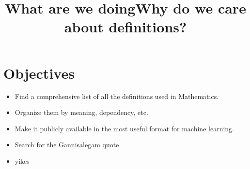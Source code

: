 \documentclass{beamer}
\begin{document}
\section{Objectives}
\begin{frame}
    \title{What are we doing}
\begin{itemize}
\item Find a comprehensive list of all the definitions used in Mathematics.
\item Organize them by meaning, dependency, etc.
\item Make it publicly available in the most useful format for machine learning.
\end{itemize}
\end{frame}

\begin{frame}
\title{Why do we care about definitions?}
\begin{itemize}
\item Search for the Gannisalegam quote
\item yikes
\end{itemize}
\end{frame}
\end{document}
